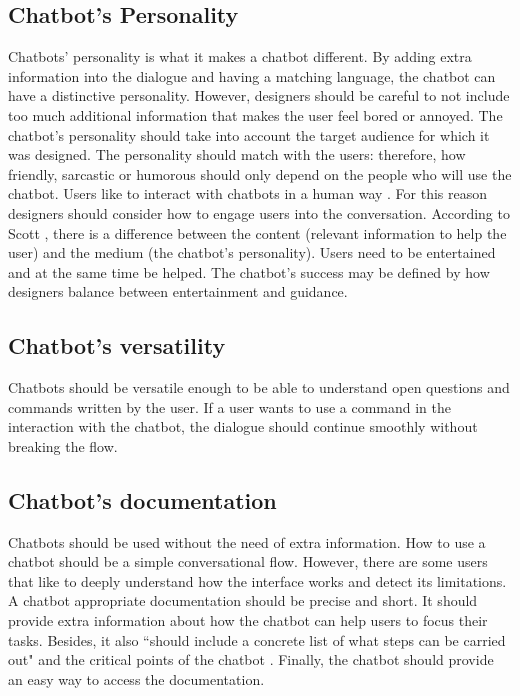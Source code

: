 \documentclass[a4paper,10pt]{article}
\begin{document}
\subsection*{Chatbot's Personality}

Chatbots’ personality is what it makes a chatbot different. By adding extra information into the dialogue and having a matching language, the chatbot can have a distinctive personality. However, designers should be careful to not include too much additional information that makes the user feel bored or annoyed. The chatbot’s personality should take into account the target audience for which it was designed. The personality should match with the users: therefore, how friendly, sarcastic or humorous should only depend on the people who will use the chatbot. Users like to interact with chatbots in a human way \cite{HeuristicsWebPage}. For this reason designers should consider how to engage users into the conversation. According to Scott \cite{HeuristicsWebPage}, there is a difference between the content (relevant information to help the user) and the medium (the chatbot’s personality). Users need to be entertained and at the same time be helped. The chatbot’s success may be defined by how designers balance between entertainment and guidance.

\subsection*{Chatbot's versatility}

Chatbots should be versatile enough to be able to understand open questions and commands written by the user. If a user wants to use a command in the interaction with the chatbot, the dialogue should continue smoothly without breaking the flow.

\subsection*{Chatbot's documentation}

Chatbots should be used without the need of extra information. How to use a chatbot should be a simple conversational flow. However, there are some users that like to deeply understand how the interface works and detect its limitations. A chatbot appropriate documentation should be precise and short. It should provide extra information about how the chatbot can help users to focus their tasks. Besides, it also ``should include a concrete list of what steps can be carried out" and the critical points of the chatbot \cite{HeuristicsWebPage}. Finally, the chatbot should provide an easy way to access the documentation.   


\medskip


\end{document}
